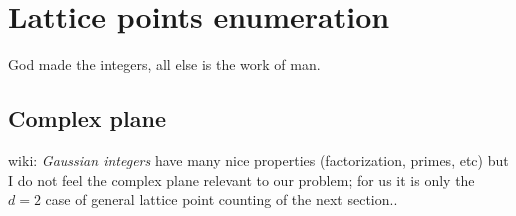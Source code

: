 
\section{Lattice points enumeration}
\label{sect:integLatt}

\renewcommand\speriod[1]{{\ensuremath{L_{#1}}}}  %
\renewcommand\period[1]{{\ensuremath{T_{#1}}}}  %

\begin{bartlett}{
God made the integers, all else is the work of man.
       }
\end{bartlett}


\subsection{Complex plane}

 {wiki}:
{\em Gaussian integers} have many nice properties (factorization, primes, etc)
but I do not feel the complex plane relevant to our problem; for us
it is only the $d=2$ case of general lattice point counting of the next section..

